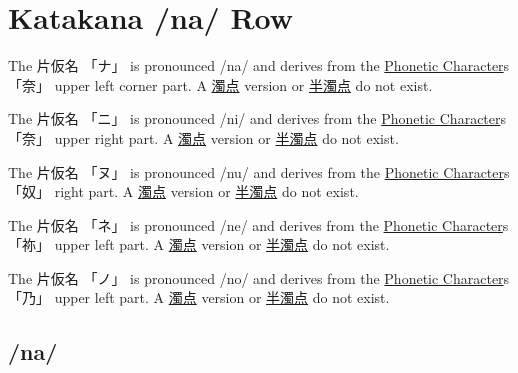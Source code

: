 \section{Katakana /na/ Row}\label{sec:KatakanaNaRow}


\label{letter:na} The  片仮名 {「ナ」} is pronounced  /na/ and  derives from the
\hyperref[sec:PhoneticCharacter]{Phonetic Character}s {「奈」} upper left corner part.
A \hyperref[sec:Dakuten]{濁点} version  or \hyperref[sec:Handakuten]{半濁点} do
not exist.

\label{letter:ni} The  片仮名 {「ニ」} is pronounced  /ni/ and  derives from the
\hyperref[sec:PhoneticCharacter]{Phonetic Character}s {「奈」} upper right part.
A \hyperref[sec:Dakuten]{濁点} version  or \hyperref[sec:Handakuten]{半濁点} do
not exist.

\label{letter:nu} The  片仮名 {「ヌ」} is pronounced  /nu/ and  derives from the
\hyperref[sec:PhoneticCharacter]{Phonetic Character}s {「奴」} right part.
A \hyperref[sec:Dakuten]{濁点} version  or \hyperref[sec:Handakuten]{半濁点} do
not exist.



\newpage

\label{letter:ne} The  片仮名 {「ネ」} is pronounced  /ne/ and  derives from the
\hyperref[sec:PhoneticCharacter]{Phonetic Character}s {「祢」} upper left  part.
A \hyperref[sec:Dakuten]{濁点} version  or \hyperref[sec:Handakuten]{半濁点} do
not exist.

\label{letter:no} The  片仮名 {「ノ」} is pronounced  /no/ and  derives from the
\hyperref[sec:PhoneticCharacter]{Phonetic Character}s {「乃」} upper left part.
A \hyperref[sec:Dakuten]{濁点} version  or \hyperref[sec:Handakuten]{半濁点} do
not exist.


\newpage

\subsection{/na/} \label{sec:KatakanaNa}

 

